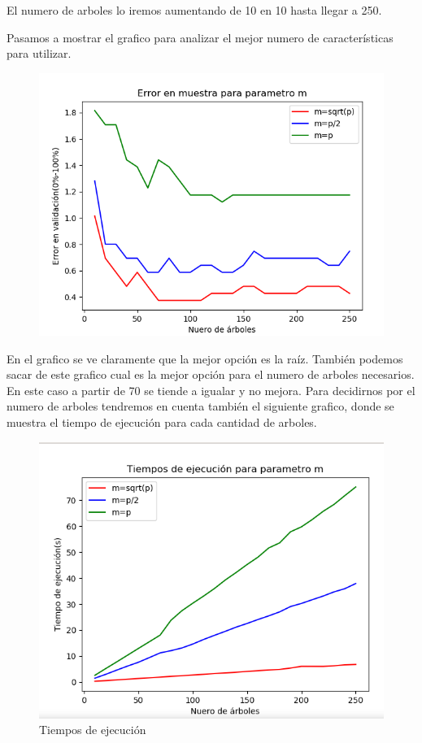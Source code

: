 \documentclass[12pt,a4paper]{article}
\begin{document}
El numero de arboles lo iremos aumentando de 10 en 10 hasta llegar a 250. 

Pasamos a mostrar el grafico para analizar el mejor numero de características para utilizar.
\begin{figure}[H]
	\centering
	\includegraphics[width=0.7\linewidth]{../imagenesRF/errorvalidacion}
	\caption[Cantidad de variables Random Foreset]{}
	\label{fig:Cantidad de variables RF}
\end{figure}
En el grafico se ve claramente que la mejor opción es la raíz. También podemos sacar de este grafico cual es la mejor opción para el numero de arboles necesarios. En este caso a partir de 70 se tiende a igualar y no mejora. Para decidirnos por el numero de arboles tendremos en cuenta también el siguiente grafico, donde se muestra el tiempo de ejecución para cada cantidad de arboles.

\begin{figure}[H]
	\centering
	\includegraphics[width=0.7\linewidth]{../imagenesRF/tiempoEjecucion}
	\caption[Tiempos de ejecución]{Tiempos de ejecución}
	\label{fig:tiempoejecucion}
\end{figure}
\end{document}
